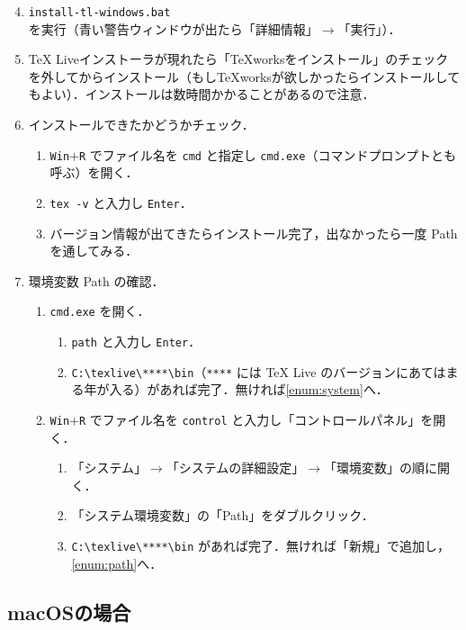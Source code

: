 \begin{enumerate}
    \setcounter{enumi}{3}
    \item \verb|install-tl-windows.bat| を実行（青い警告ウィンドウが出たら「詳細情報」$\to$「実行」）．\label{enum:bat}
    \item TeX Liveインストーラが現れたら「TeXworksをインストール」のチェックを外してからインストール（もしTeXworksが欲しかったらインストールしてもよい）．インストールは数時間かかることがあるので注意．
    \item インストールできたかどうかチェック．
    \begin{enumerate}
        \item \verb|Win|$+$\verb|R| でファイル名を \verb|cmd| と指定し \verb|cmd.exe|（コマンドプロンプトとも呼ぶ）を開く．
        \item \verb|tex -v| と入力し \verb|Enter|．
        \item バージョン情報が出てきたらインストール完了，出なかったら一度 Path を通してみる．
    \end{enumerate}
    \item 環境変数 Path の確認．
    \begin{enumerate}
        \item \verb|cmd.exe| を開く．\label{enum:path}
        \begin{enumerate}
            \item \verb|path| と入力し \verb|Enter|．
            \item \verb|C:\texlive\****\bin|（\verb|****| には TeX Live のバージョンにあてはまる年が入る）があれば完了．無ければ\ref{enum:system}へ．
        \end{enumerate}
        \item \verb|Win|$+$\verb|R| でファイル名を \verb|control| と入力し「コントロールパネル」を開く．\label{enum:system}
        \begin{enumerate}
            \item 「システム」$\to$「システムの詳細設定」$\to$「環境変数」の順に開く．
            \item 「システム環境変数」の「Path」をダブルクリック．
            \item \verb|C:\texlive\****\bin| があれば完了．無ければ「新規」で追加し，\ref{enum:path}へ．
        \end{enumerate}
    \end{enumerate}
\end{enumerate}

\subsection{macOSの場合}
\label{ssec:mac}



